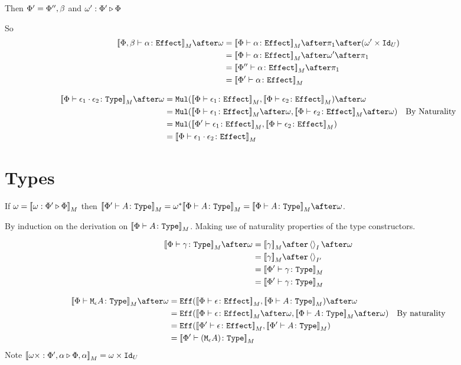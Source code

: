 \documentclass{report}
\begin{document}
Then $\Phi'=\Phi'',\beta$ and $\omega' : \Phi' \triangleright \Phi$

So \begin{align}
    \deno{\typerelation{\P,\b}{\a}{\effect}}\after\w &= \deno{\typerelation{\P}{\a}{\effect}}\after\p\after(\w'\times\Id{U})\\
    &=\deno{\typerelation{\P}{\a}{\effect}}\after\w'\after\p\\
    & = \deno{\typerelation{\P''}{\a}{\effect}}\after\p\\
    & = \deno{\typerelation{\P'}{\a}{\effect}}\\
\end{align}

\begin{align}
    \deno{\typerelation{\P}{\e_1\dot\e_2}{\type}} \after\w &=
    \Mul(\deno{\typerelation{\P}{\e_1}{\effect}}, \deno{\typerelation{\P}{\e_2}{\effect}})\after \w \\
    & = \Mul(\deno{\typerelation{\P}{\e_1}{\effect}}\after \w, \deno{\typerelation{\P}{\e_2}{\effect}}\after \w)\qt{By Naturality}\\
    & = \Mul(\deno{\typerelation{\P'}{\e_1}{\effect}}, \deno{\typerelation{\P}{\e_2}{\effect}})\\
    & = \deno{\typerelation{\P}{\e_1\dot\e_2}{\effect}}
\end{align}


\section{Types}
If $\omega = {\bf [\![}\omega : \Phi' \triangleright \Phi{\bf ]\!]}_M$ then $\deno{\typerelation{\P'}{A}{\type}} = \w\star\deno{\typerelation{\P}{A}{\type}} = \deno{\typerelation{\P}{A}{\type}}\after\w$.

\proof
By induction on the derivation on ${\bf [\![}\Phi \vdash A \colon \texttt{Type}{\bf ]\!]}_M$. Making use of naturality properties of the type constructors.

\begin{align}
    \deno{\typerelation{\P}{\g}{\type}}\after\w &= \deno{\g}\after\term{I}\after\w\\
    & =  \deno{\g}\after\term{I'}\\
    & = \deno{\typerelation{\P'}{\g}{\type}}\\
    & = \deno{\typerelation{\P'}{\g}{\type}}
\end{align}

\begin{align}
    \deno{\typerelation{\P}{\mea}{\type}}\after\w & =  \Eff(\deno{\typerelation{\P}{\e}{\effect}}, \deno{\typerelation{\P}{A}{\type}})\after\w \\
    & = \Eff(\deno{\typerelation{\P}{\e}{\effect}}\after\w, \deno{\typerelation{\P}{A}{\type}}\after\w) \qt{By naturality}\\
    & = \Eff(\deno{\typerelation{\P'}{\e}{\effect}}, \deno{\typerelation{\P'}{A}{\type}})\\
    & = \deno{\typerelation{\P'}{(\mea)}{\type}}
\end{align}
    Note ${\bf [\![}\omega\times : \Phi',\alpha \triangleright \Phi,\alpha{\bf ]\!]}_M = \omega\times\texttt{Id}_{U}$
\end{document}
